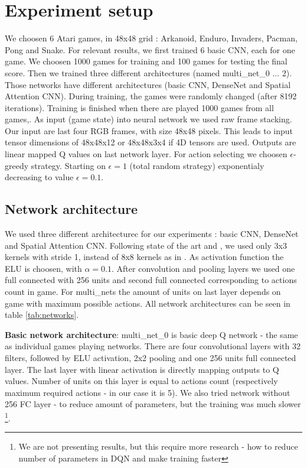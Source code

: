\documentclass[10pt,a4paper]{article}
\begin{document}
\newpage
\section{Experiment setup}

We choosen 6 Atari games, in 48x48 grid : Arkanoid, Enduro, Invaders, Pacman, Pong and Snake.
For relevant results, we first trained 6 basic CNN, each for one game. We choosen 1000 games for training and 100 games for testing the final score.
Then we trained three different architectures (named multi\_net\_0 ... 2). Those networks have different architectures (basic CNN, DenseNet and Spatial Attention CNN).
During training, the games were randomly changed (after 8192 iterations). Training is finished when there are played 1000 games from all games,.
As input (game state) into neural network we used raw frame stacking. Our input are last four RGB frames, with size 48x48 pixels. This leads to input tensor dimensions of 48x48x12 or 48x48x3x4 if
4D tensors are used. Outputs are linear mapped Q values on last network layer.
For action selecting we choosen $\epsilon$-greedy strategy. Starting on $\epsilon = 1$ (total random strategy) exponentialy decreasing to value $\epsilon = 0.1$.

\subsection {Network architecture}
We used three different architecturec for our experiments : basic CNN, DenseNet and Spatial Attention CNN.
Following state of the art \cite{bib:vgg_net} and \cite{bib:resnet_net}, we used only 3x3 kernels with stride 1, instead of 8x8 kernels as in \cite{bib:dqn_atari}.
As activation function the ELU is choosen, with $\alpha = 0.1$. After convolution and pooling layers we used one full connected with 256 units and second
full connected corresponding to actions count in game. For multi\_nets the amount of units on last layer depends on game with maximum possible actions.
All network architectures can be seen in table \ref{tab:networks}.

{\bf Basic network architecture}:
multi\_net\_0 is basic deep Q network - the same as individual games playing networks.
There are four convolutional layers with 32 filters, followed by ELU activation, 2x2 pooling and one 256 units full connected layer.
The last layer with linear activation is directly mapping outputs to Q values. Number of units on this layer is equal to actions count
(respectively maximum required actions - in our case it is 5).
We also tried network without 256 FC layer - to reduce amount of parameters, but the training was much slower \footnote {We are not presenting results, but this require more research - how to reduce number of parameters in DQN and make training faster}.
\end{document}
